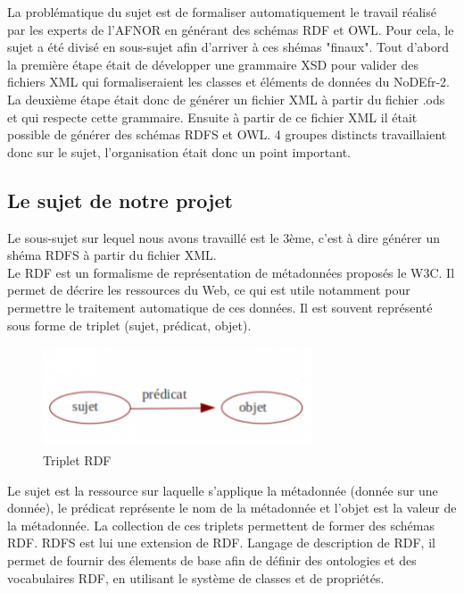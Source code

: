 \documentclass{article}
\begin{document}
La problématique du sujet est de formaliser automatiquement le travail réalisé par les experts de l'AFNOR en générant des schémas RDF et OWL. Pour cela, le sujet a été divisé en sous-sujet afin d'arriver à ces shémas "finaux". Tout d'abord la première étape était de développer une grammaire XSD pour valider des fichiers XML qui formaliseraient les classes et éléments de données du NoDEfr-2. La deuxième étape était donc de générer un fichier XML à partir du fichier .ods et qui respecte cette grammaire. Ensuite à partir de ce fichier XML il était possible de générer des schémas RDFS et OWL. 4 groupes distincts travaillaient donc sur le sujet, l'organisation était donc un point important.

\subsection{Le sujet de notre projet}

Le sous-sujet sur lequel nous avons travaillé est le 3ème, c'est à dire générer un shéma RDFS à partir du fichier XML.\\

Le RDF est un formalisme de représentation de métadonnées proposés le W3C. Il permet de décrire les ressources du Web, ce qui est utile notamment pour permettre le traitement automatique de ces données. Il est souvent représenté sous forme de triplet (sujet, prédicat, objet).

\begin{figure}[!ht]
    \center
    \includegraphics[width=8cm, height=3cm]{img/triplet}
    \caption{Triplet RDF}
\end{figure}

Le sujet est la ressource sur laquelle s'applique la métadonnée (donnée sur une donnée), le prédicat représente le nom de la métadonnée et l'objet est la valeur de la métadonnée. La collection de ces triplets permettent de former des schémas RDF. RDFS est lui une extension de RDF. Langage de description de RDF, il permet de fournir des élements de base afin de définir des ontologies et des vocabulaires RDF, en utilisant le système de classes et de propriétés.\\
\end{document}
